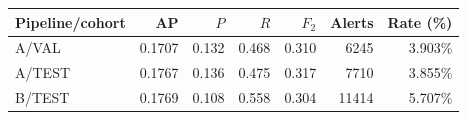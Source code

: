 \begin{tabular}{@{}l r r r r r r@{}}
\toprule
Pipeline/cohort & AP & $P$ & $R$ & $F_2$ & Alerts & Rate (\%) \\
\midrule
A/VAL & 0.1707 & 0.132 & 0.468 & 0.310 & 6245 & 3.903\% \\
A/TEST & 0.1767 & 0.136 & 0.475 & 0.317 & 7710 & 3.855\% \\
B/TEST & 0.1769 & 0.108 & 0.558 & 0.304 & 11414 & 5.707\% \\
\bottomrule
\end{tabular}
